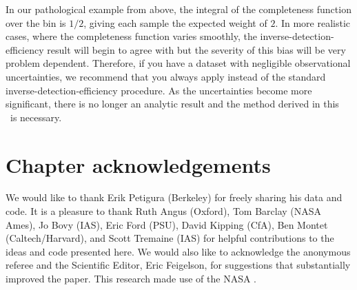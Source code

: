 In our pathological example from above, the integral of the completeness
function over the bin is $1/2$, giving each sample the expected weight of $2$.
In more realistic cases, where the completeness function varies smoothly, the
inverse-detection-efficiency result will begin to agree with  but
the severity of this bias will be very problem dependent.
Therefore, if you have a dataset with negligible observational uncertainties,
we recommend that you always apply  instead of the standard
inverse-detection-efficiency procedure.
As the uncertainties become more significant, there is no longer an analytic
result and the method derived in this \paper\ is necessary.

\section{Chapter acknowledgements}

We would like to thank Erik Petigura (Berkeley) for freely sharing his data
and code.
It is a pleasure to thank
Ruth Angus (Oxford),
Tom Barclay (NASA Ames),
Jo Bovy (IAS),
Eric Ford (PSU),
David Kipping (CfA),
Ben Montet (Caltech/Harvard), and
Scott Tremaine (IAS)
for helpful contributions to the ideas and code presented here.
We would also like to acknowledge the anonymous referee and the Scientific
Editor, Eric Feigelson, for suggestions that
substantially improved the paper.
This research made use of the NASA .
